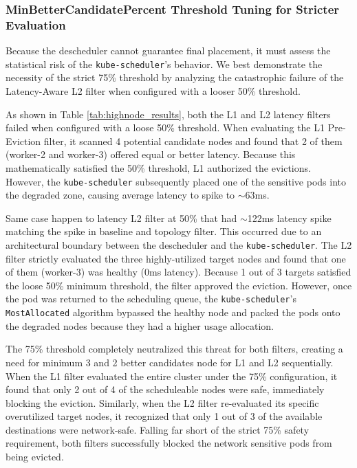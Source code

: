\subsubsection{MinBetterCandidatePercent Threshold Tuning for Stricter Evaluation}
\label{subsubsec:netaware4_resultanalysis2_tuning}

Because the descheduler cannot guarantee final placement, it must assess the statistical risk of the \texttt{kube-scheduler}'s behavior. We best demonstrate the necessity of the strict 75\% threshold by analyzing the catastrophic failure of the Latency-Aware L2 filter when configured with a looser 50\% threshold.

As shown in Table \ref{tab:highnode_results}, both the L1 and L2 latency filters failed when configured with a loose 50\% threshold. When evaluating the L1 Pre-Eviction filter, it scanned 4 potential candidate nodes and found that 2 of them (worker-2 and worker-3) offered equal or better latency. Because this mathematically satisfied the 50\% threshold, L1 authorized the evictions. However, the \texttt{kube-scheduler} subsequently placed one of the sensitive pods into the degraded zone, causing average latency to spike to $\sim$63ms.

Same case happen to latency L2 filter at 50\% that had $\sim$122ms latency spike matching the spike in baseline and topology filter. This occurred due to an architectural boundary between the descheduler and the \texttt{kube-scheduler}. The L2 filter strictly evaluated the three highly-utilized target nodes and found that one of them (worker-3) was healthy (0ms latency). Because 1 out of 3 targets satisfied the loose 50\% minimum threshold, the filter approved the eviction. However, once the pod was returned to the scheduling queue, the \texttt{kube-scheduler}'s \texttt{MostAllocated} algorithm bypassed the healthy node and packed the pods onto the degraded nodes because they had a higher usage allocation.

The 75\% threshold completely neutralized this threat for both filters, creating a need for minimum 3 and 2 better candidates node for L1 and L2 sequentially. When the L1 filter evaluated the entire cluster under the 75\% configuration, it found that only 2 out of 4 of the scheduleable nodes were safe, immediately blocking the eviction. Similarly, when the L2 filter re-evaluated its specific overutilized target nodes, it recognized that only 1 out of 3 of the available destinations were network-safe. Falling far short of the strict 75\% safety requirement, both filters successfully blocked the network sensitive pods from being evicted.

